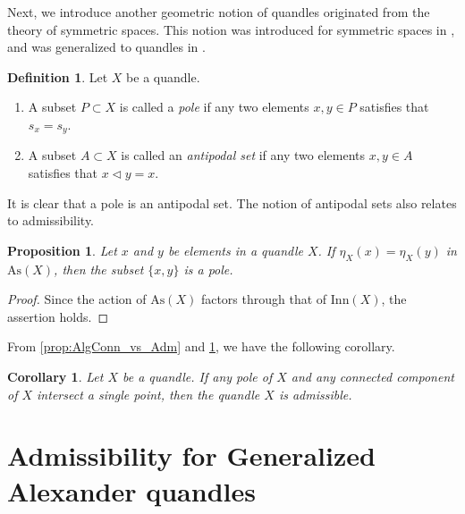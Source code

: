 \documentclass[dvipdfmx,12pt]{amsart}
\theoremstyle{plain}
\newtheorem{cor}[thm]{Corollary}
\newtheorem{prop}[thm]{Proposition}
\theoremstyle{definition}
\newtheorem{dfn}[thm]{Definition}
\newcommand{\As}{\mathrm{As}}
\newcommand{\qop}{\triangleleft}
\newcommand{\Inn}{\mathrm{Inn}}
\begin{document}
Next, we introduce another geometric notion of quandles originated from the theory of symmetric spaces.
This notion was introduced for symmetric spaces in \cite{Chen-1988-RiemannianGeometricInvariantItsa}, 
and was generalized to quandles in \cite{Kubo-2022-CommutativityConditionSubsetsQuandlesa}.
\begin{dfn}\label{def:antipodal}
  Let $X$ be a quandle.
  \begin{enumerate}
    \item A subset $P \subset X$ is called a \emph{pole} if any two elements $x, y \in P$ satisfies that $s_x = s_y$.

    \item A subset $A \subset X$ is called an \emph{antipodal set} if any two elements $x, y \in A$ satisfies that $x \qop y = x$.
  \end{enumerate}
\end{dfn}

It is clear that a pole is an antipodal set.  
The notion of antipodal sets also relates to admissibility.



\begin{prop}\label{prop:Ant_vs_Adm}
  Let $x$ and $y$ be elements in  a quandle $X$.
  If $\eta_X(x) = \eta_X(y)$ in $\As(X)$, then the subset $\{x, y\}$ is a pole.
\end{prop}
\begin{proof}
  Since the action of $\As(X)$ factors through that of $\Inn(X)$, the assertion holds.
\end{proof}
From \cref{prop:AlgConn_vs_Adm} and \cref{prop:Ant_vs_Adm}, we have the following corollary.
\begin{cor}\label{cor:geometric_condition}
  Let $X$ be a quandle.
  If any pole of $X$ and any connected component of $X$ intersect a single point, then the quandle $X$ is admissible.
\end{cor}

\section{Admissibility for Generalized Alexander quandles}\label{sec:GAlex}
\end{document}
